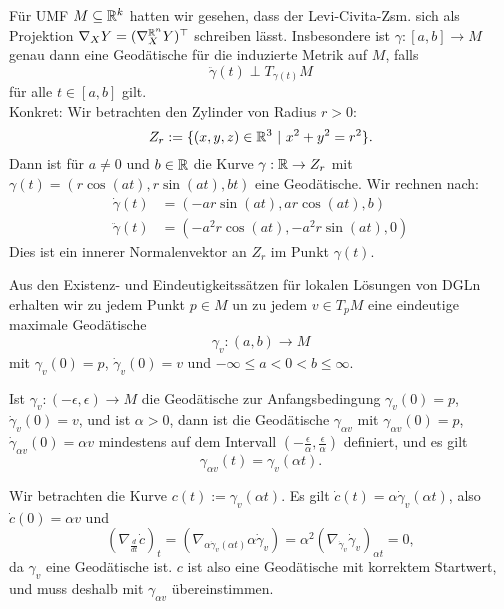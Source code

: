 \begin{beispiel}
Für UMF $M \subseteq \mathbb{R}^k$ hatten wir gesehen, dass der Levi-Civita-Zsm. sich als Projektion $\nabla_X Y = (\nabla_X^{\mathbb{R}^n} Y)^{\top}$ schreiben lässt. Insbesondere ist $\gamma: [a,b] \to M$ genau dann eine Geodätische für die induzierte Metrik auf $M$, falls 
\begin{equation}
\ddot{\gamma}(t) \perp T_{\gamma(t)} M
\end{equation} 
für alle $t \in [a,b]$ gilt.\\
Konkret: Wir betrachten den Zylinder von Radius $r>0$:
\begin{equation}
Z_r := \{ (x,y,z) \in \R^3 \ | \ x^2+y^2=r^2 \}.
\end{equation}
Dann ist für $a \neq 0$ und $b \in \mathbb{R}$ die Kurve $\gamma: \mathbb{R} \to Z_r$ mit $\gamma(t) = (r \cos (at), r \sin (at), bt)$ eine Geodätische. Wir rechnen nach:
\begin{align}
\dot{\gamma}(t) &= (-ar \sin (at), ar \cos(at), b)\\
\ddot{\gamma}(t) &= (-a^2r \cos(at), -a^2 r \sin(at), 0)
\end{align}
Dies ist ein innerer Normalenvektor an $Z_r$ im Punkt $\gamma (t)$.
\end{beispiel}
Aus den Existenz- und Eindeutigkeitssätzen für lokalen Lösungen von DGLn erhalten wir zu jedem Punkt $p \in M$ un zu jedem $v \in T_pM$ eine eindeutige maximale Geodätische
\begin{equation}
\gamma_v : (a,b) \to M
\end{equation}
mit $\gamma_v(0)=p$, $\dot{\gamma}_v(0) = v$ und $- \infty \leq a <0 < b \leq \infty$.
\begin{lemma}{}{}
Ist $\gamma_v: (- \epsilon, \epsilon) \to M$ die Geodätische zur Anfangsbedingung $\gamma_v (0) = p$, $\dot{\gamma}_v(0) = v$, und ist $\alpha > 0$, dann ist die Geodätische $\gamma_{\alpha v}$ mit $\gamma_{\alpha v} (0) = p$, $\dot{\gamma}_{\alpha v} (0)= \alpha v$ mindestens auf dem Intervall $\left( -\frac{\epsilon}{\alpha}, \frac{\epsilon}{\alpha} \right)$ definiert, und es gilt
\begin{equation}
\gamma_{\alpha v} (t) = \gamma_v (\alpha t).
\end{equation}
\end{lemma}
\begin{beweis}
Wir betrachten die Kurve $c(t) := \gamma_v (\alpha t)$. Es gilt $\dot{c} (t) = \alpha \dot{\gamma}_v (\alpha t)$, also $\dot{c}(0) = \alpha v$ und 
\begin{equation}
\left( \nabla_\frac{d}{dt} \dot{c} \right)_t = \left( \nabla_{\alpha \dot{\gamma}_v (\alpha t)} \alpha \dot{\gamma}_v \right) = \alpha^2 \left( \nabla_{\dot{\gamma}_v} \dot{\gamma}_v\right)_{\alpha t} = 0,
\end{equation}
da $\gamma_v$ eine Geodätische ist. $c$ ist also eine Geodätische mit korrektem Startwert, und muss deshalb mit $\gamma_{\alpha v}$ übereinstimmen.
\end{beweis}
